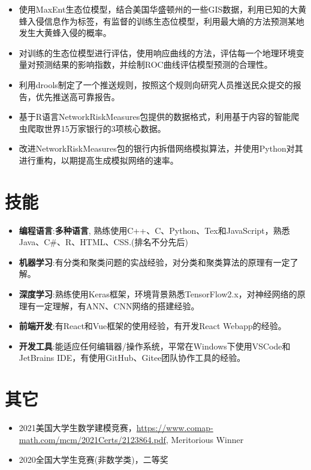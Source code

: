 \documentclass{resume}
\begin{document}
\begin{itemize}[parsep=0.25ex]
	\item 使用MaxEnt生态位模型，结合美国华盛顿州的一些GIS数据，利用已知的大黄蜂入侵信息作为标签，有监督的训练生态位模型，利用最大熵的方法预测某地发生大黄蜂入侵的概率。
	\item 对训练的生态位模型进行评估，使用响应曲线的方法，评估每一个地理环境变量对预测结果的影响指数，并绘制ROC曲线评估模型预测的合理性。
	\item 利用drools制定了一个推送规则，按照这个规则向研究人员推送民众提交的报告，优先推送高可靠报告。
\end{itemize}
\begin{itemize}[parsep=0.25ex]
	\item 基于R语言NetworkRiskMeasures包提供的数据格式，利用基于内容的智能爬虫爬取世界15万家银行的3项核心数据。
	\item 改进NetworkRiskMeasures包的银行内拆借网络模拟算法，并使用Python对其进行重构，以期提高生成模拟网络的速率。
\end{itemize}
\section{技能}
\begin{itemize}[parsep=0.25ex]
\item \textbf{编程语言}:\textbf{多种语言},
熟练使用C++、C、Python、Tex和JavaScript，熟悉Java、C\#、R、HTML、CSS.(排名不分先后)
\item \textbf{机器学习}:有分类和聚类问题的实战经验，对分类和聚类算法的原理有一定了解。
\item \textbf{深度学习}:熟练使用Keras框架，环境背景熟悉TensorFlow2.x，对神经网络的原理有一定理解，有ANN、CNN网络的搭建经验。
\item \textbf{前端开发}:有React和Vue框架的使用经验，有开发React Webapp的经验。
\item \textbf{开发工具}:能适应任何编辑器/操作系统，平常在Windows下使用VSCode和JetBrains IDE，有使用GitHub、Gitee团队协作工具的经验。
\end{itemize}
\section{其它}
\begin{itemize}[parsep=0.25ex]
	\item 2021美国大学生数学建模竞赛，\url{https://www.comap-math.com/mcm/2021Certs/2123864.pdf}, Meritorious Winner
	\item 2020全国大学生竞赛(非数学类)，二等奖
	
\end{itemize}
\end{document}
